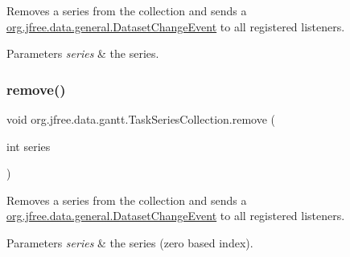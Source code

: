 Removes a series from the collection and sends a \mbox{\hyperlink{classorg_1_1jfree_1_1data_1_1general_1_1_dataset_change_event}{org.\+jfree.\+data.\+general.\+Dataset\+Change\+Event}} to all registered listeners.


\begin{DoxyParams}{Parameters}
{\em series} & the series. \\
\hline
\end{DoxyParams}
\mbox{\label{classorg_1_1jfree_1_1data_1_1gantt_1_1_task_series_collection_a39d5e0975202db44927e45e7cf487643}} 
\subsubsection{\texorpdfstring{remove()}{remove()}\hspace{0.1cm}{\footnotesize\ttfamily [2/2]}}
{\footnotesize\ttfamily void org.\+jfree.\+data.\+gantt.\+Task\+Series\+Collection.\+remove (\begin{DoxyParamCaption}\item[{int}]{series }\end{DoxyParamCaption})}

Removes a series from the collection and sends a \mbox{\hyperlink{classorg_1_1jfree_1_1data_1_1general_1_1_dataset_change_event}{org.\+jfree.\+data.\+general.\+Dataset\+Change\+Event}} to all registered listeners.


\begin{DoxyParams}{Parameters}
{\em series} & the series (zero based index). \\
\hline
\end{DoxyParams}
\mbox{\label{classorg_1_1jfree_1_1data_1_1gantt_1_1_task_series_collection_ab6e84efa5e184731095f371f6a903bf0}} 
